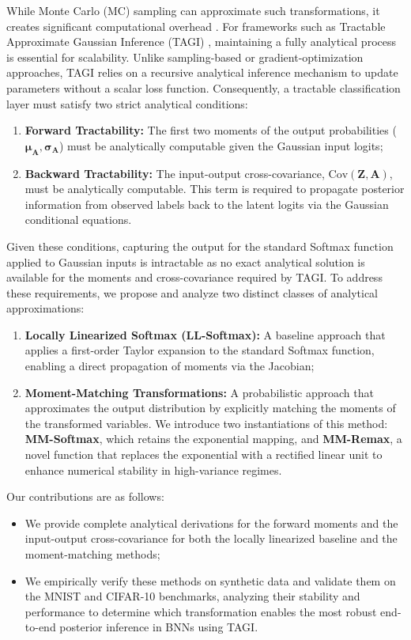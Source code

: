 \documentclass{uai2026} %
\begin{document}
While Monte Carlo (MC) sampling can approximate such transformations, it creates significant computational overhead \citep{Mucsanyietal2025}. For frameworks such as Tractable Approximate Gaussian Inference (TAGI) \citep{goulet2021tractable,nguyen2022analytically}, maintaining a fully analytical process is essential for scalability. Unlike sampling-based or gradient-optimization approaches, TAGI relies on a recursive analytical inference mechanism to update parameters without a scalar loss function. Consequently, a tractable classification layer must satisfy two strict analytical conditions:
\begin{enumerate}
    \item \textbf{Forward Tractability:} The first two moments of the output probabilities ($\bm{\mu}_{\bm{A}}, \bm{\sigma}_{\bm{A}}$) must be analytically computable given the Gaussian input logits;
    \item \textbf{Backward Tractability:} The input-output cross-covariance, $\text{Cov}(\bm{Z}, \bm{A})$, must be analytically computable. This term is required to propagate posterior information from observed labels back to the latent logits via the Gaussian conditional equations.
\end{enumerate}

Given these conditions, capturing the output for the standard Softmax function applied to Gaussian inputs is intractable as no exact analytical solution is available for the moments and cross-covariance required by TAGI. To address these requirements, we propose and analyze two distinct classes of analytical approximations:
\begin{enumerate}
    \item \textbf{Locally Linearized Softmax (LL-Softmax):} A baseline approach that applies a first-order Taylor expansion to the standard Softmax function, enabling a direct propagation of moments via the Jacobian;
    \item \textbf{Moment-Matching Transformations:} A probabilistic approach that approximates the output distribution by explicitly matching the moments of the transformed variables. We introduce two instantiations of this method: \textbf{MM-Softmax}, which retains the exponential mapping, and \textbf{MM-Remax}, a novel function that replaces the exponential with a rectified linear unit to enhance numerical stability in high-variance regimes.
\end{enumerate}

Our contributions are as follows:
\begin{itemize}
    \item We provide complete analytical derivations for the forward moments and the input-output cross-covariance for both the locally linearized baseline and the moment-matching methods;
    \item We empirically verify these methods on synthetic data and validate them on the MNIST \citep{lecun1998gradient} and CIFAR-10 \citep{krizhevsky2009learning} benchmarks, analyzing their stability and performance to determine which transformation enables the most robust end-to-end posterior inference in BNNs using TAGI.
\end{itemize}
\end{document}
